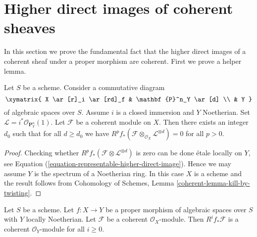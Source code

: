 \section{Higher direct images of coherent sheaves}
\label{section-proper-pushforward}

\noindent
In this section we prove the fundamental fact that the higher
direct images of a coherent sheaf under a proper morphism
are coherent. First we prove a helper lemma.

\begin{lemma}
\label{lemma-kill-by-twisting}
Let $S$ be a scheme. Consider a commutative diagram
$$
\xymatrix{
X \ar[r]_i \ar[rd]_f & \mathbf{P}^n_Y \ar[d] \\
& Y
}
$$
of algebraic spaces over $S$. Assume $i$ is a closed immersion
and $Y$ Noetherian. Set $\mathcal{L} = i^*\mathcal{O}_{\mathbf{P}^n_Y}(1)$.
Let $\mathcal{F}$ be a coherent module on $X$.
Then there exists an integer $d_0$ such that for all $d \geq d_0$ we have
$R^pf_*(\mathcal{F} \otimes_{\mathcal{O}_X} \mathcal{L}^{\otimes d}) = 0$
for all $p > 0$.
\end{lemma}

\begin{proof}
Checking whether $R^pf_*(\mathcal{F} \otimes \mathcal{L}^{\otimes d})$
is zero can be done \'etale locally on $Y$, see
Equation (\ref{equation-representable-higher-direct-image}).
Hence we may assume $Y$ is the spectrum of a Noetherian ring. In this case
$X$ is a scheme and the result follows from
Cohomology of Schemes, Lemma \ref{coherent-lemma-kill-by-twisting}.
\end{proof}

\begin{lemma}
\label{lemma-proper-pushforward-coherent}
Let $S$ be a scheme. Let $f : X \to Y$ be a proper morphism
of algebraic spaces over $S$ with $Y$ locally Noetherian.
Let $\mathcal{F}$ be a coherent $\mathcal{O}_X$-module.
Then $R^if_*\mathcal{F}$ is a coherent $\mathcal{O}_Y$-module
for all $i \geq 0$.
\end{lemma}

